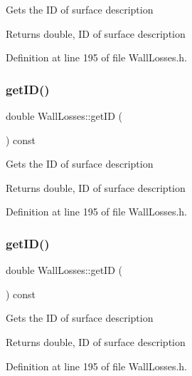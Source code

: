 Gets the ID of surface description \begin{DoxyReturn}{Returns}
double, ID of surface description 
\end{DoxyReturn}


Definition at line 195 of file Wall\+Losses.\+h.

\mbox{\label{class_wall_losses_ad67b46094ba89cb759ec124c63c137de}} 
\subsubsection{\texorpdfstring{get\+I\+D()}{getID()}\hspace{0.1cm}{\footnotesize\ttfamily [2/3]}}
{\footnotesize\ttfamily double Wall\+Losses\+::get\+ID (\begin{DoxyParamCaption}{ }\end{DoxyParamCaption}) const\hspace{0.3cm}{\ttfamily [inline]}}

Gets the ID of surface description \begin{DoxyReturn}{Returns}
double, ID of surface description 
\end{DoxyReturn}


Definition at line 195 of file Wall\+Losses.\+h.

\mbox{\label{class_wall_losses_ad67b46094ba89cb759ec124c63c137de}} 
\subsubsection{\texorpdfstring{get\+I\+D()}{getID()}\hspace{0.1cm}{\footnotesize\ttfamily [3/3]}}
{\footnotesize\ttfamily double Wall\+Losses\+::get\+ID (\begin{DoxyParamCaption}{ }\end{DoxyParamCaption}) const\hspace{0.3cm}{\ttfamily [inline]}}

Gets the ID of surface description \begin{DoxyReturn}{Returns}
double, ID of surface description 
\end{DoxyReturn}


Definition at line 195 of file Wall\+Losses.\+h.

